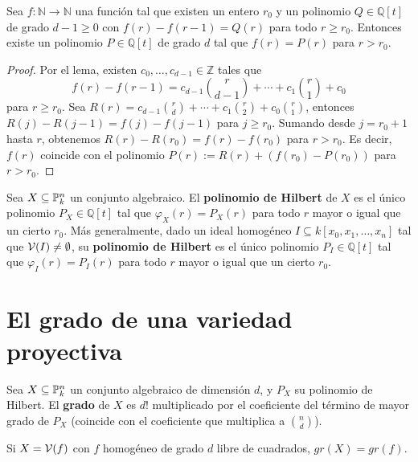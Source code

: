 \documentclass[ACGA.tex]{subfiles}
\begin{document}
\begin{coro}\label{polinomiodiff}
 Sea $f:{\mathbb N}\to{\mathbb N}$ una función tal que existen un entero $r_0$ y un polinomio $Q\in{\mathbb Q}[t]$ de grado $d-1\geq 0$ con $f(r)-f(r-1)=Q(r)$ para todo $r\geq r_0$. Entonces existe un polinomio $P\in{\mathbb Q}[t]$ de grado $d$ tal que $f(r)=P(r)$ para $r> r_0$.
\end{coro}

\begin{proof} Por el lema, existen $c_0,\ldots,c_{d-1}\in{\mathbb Z}$ tales que
$$
f(r)-f(r-1)=c_{d-1}{r\choose{d-1}}+\cdots+c_1{r\choose 1}+c_0
$$
para $r\geq r_0$. Sea $R(r)=c_{d-1}{r\choose{d}}+\cdots+c_1{r\choose 2}+c_0{r\choose 1}$, entonces $R(j)-R(j-1)=f(j)-f(j-1)$ para $j\geq r_0$. Sumando desde $j=r_0+1$ hasta $r$, obtenemos $R(r)-R(r_0)=f(r)-f(r_0)$ para $r>r_0$. Es decir, $f(r)$ coincide con el polinomio $P(r):=R(r)+(f(r_0)-P(r_0))$ para $r>r_0$.
\end{proof}

\begin{defi}
 Sea $X\subseteq\mathbb{P}^n_k$ un conjunto algebraico. El {\bf polinomio de Hilbert} de $X$ es el único polinomio $P_X\in{\mathbb Q}[t]$ tal que $\varphi_X(r)=P_X(r)$ para todo $r$ mayor o igual que un cierto $r_0$. Más generalmente, dado un ideal homogéneo $I\subseteq k[x_0,x_1,\ldots,x_n]$ tal que $\mathcal{V}(I)\neq\emptyset$, su {\bf polinomio de Hilbert} es el único polinomio $P_I\in{\mathbb Q}[t]$ tal que $\varphi_I(r)=P_I(r)$ para todo $r$ mayor o igual que un cierto $r_0$.
\end{defi}

\section{El grado de una variedad proyectiva}

\begin{defi}
 Sea $X\subseteq\mathbb{P}^n_k$ un conjunto algebraico de dimensión $d$, y $P_X$ su polinomio de Hilbert. El {\bf grado} de $X$ es $d!$ multiplicado por el coeficiente del término de mayor grado de $P_X$ (coincide con el coeficiente que multiplica a $\binom{n}{d}$).
\end{defi}

\begin{prop}
Si $X=\mathcal{V}(f)$ con $f$ homogéneo de grado $d$ libre de cuadrados, $gr(X)=gr(f)$. 
\end{prop}
\end{document}
